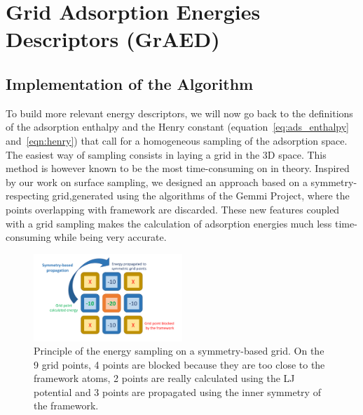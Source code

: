 \documentclass[main]{subfiles}
\begin{document}
\section{Grid Adsorption Energies Descriptors (GrAED)}

\subsection{Implementation of the Algorithm}

To build more relevant energy descriptors, we will now go back to the definitions of the adsorption enthalpy and the Henry constant (equation~\ref{eq:ads_enthalpy} and~\ref{eqn:henry}) that call for a homogeneous sampling of the adsorption space. The easiest way of sampling consists in laying a grid in the 3D space. This method is however known to be the most time-consuming on in theory. Inspired by our work on surface sampling, we designed an approach based on a symmetry-respecting grid,generated using the algorithms of the Gemmi Project,\cite{Wojdyr_2022} where the points overlapping with framework are discarded. These new features coupled with a grid sampling makes the calculation of adsorption energies much less time-consuming while being very accurate.

\begin{figure}[ht]
  \centering
    \includegraphics[width=0.5\textwidth]{figures/3-fastsim/grid_sampling.pdf}
    \caption{Principle of the energy sampling on a symmetry-based grid. On the 9 grid points, 4 points are blocked because they are too close to the framework atoms, 2 points are really calculated using the LJ potential and 3 points are propagated using the inner symmetry of the framework.}\label{fgr:principle_grid}
\end{figure}
\end{document}
